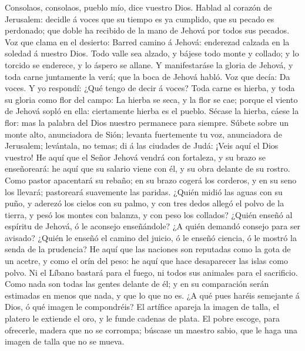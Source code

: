  Consolaos, consolaos, pueblo mío, dice vuestro Dios.
 Hablad al corazón de Jerusalem: decidle á voces que su
tiempo es ya cumplido, que su pecado es perdonado; que doble ha recibido
de la mano de Jehová por todos sus pecados.  Voz que clama
en el desierto: Barred camino á Jehová: enderezad calzada en la soledad
á nuestro Dios.  Todo valle sea alzado, y bájese todo
monte y collado; y lo torcido se enderece, y lo áspero se allane.
 Y manifestaráse la gloria de Jehová, y toda carne
juntamente la verá; que la boca de Jehová habló.  Voz que
decía: Da voces. Y yo respondí: ¿Qué tengo de decir á voces? Toda carne
es hierba, y toda su gloria como flor del campo:  La
hierba se seca, y la flor se cae; porque el viento de Jehová sopló en
ella: ciertamente hierba es el pueblo.  Sécase la hierba,
cáese la flor: mas la palabra del Dios nuestro permanece para siempre.
 Súbete sobre un monte alto, anunciadora de Sión; levanta
fuertemente tu voz, anunciadora de Jerusalem; levántala, no temas; di á
las ciudades de Judá: ¡Veis aquí el Dios vuestro!  He
aquí que el Señor Jehová vendrá con fortaleza, y su brazo se
enseñoreará: he aquí que su salario viene con él, y su obra delante de
su rostro.  Como pastor apacentará su rebaño; en su brazo
cogerá los corderos, y en su seno los llevará; pastoreará suavemente las
paridas.  ¿Quién midió las aguas con su puño, y aderezó
los cielos con su palmo, y con tres dedos allegó el polvo de la tierra,
y pesó los montes con balanza, y con peso los collados? 
¿Quién enseñó al espíritu de Jehová, ó le aconsejo enseñándole?
 ¿A quién demandó consejo para ser avisado? ¿Quién le
enseñó el camino del juicio, ó le enseñó ciencia, ó le mostró la senda
de la prudencia?  He aquí que las naciones son reputadas
como la gota de un acetre, y como el orín del peso: he aquí que hace
desaparecer las islas como polvo.  Ni el Líbano bastará
para el fuego, ni todos sus animales para el sacrificio. 
Como nada son todas las gentes delante de él; y en su comparación serán
estimadas en menos que nada, y que lo que no es.  ¿A qué
pues haréis semejante á Dios, ó qué imagen le compondréis?
 El artífice apareja la imagen de talla, el platero le
extiende el oro, y le funde cadenas de plata.  El pobre
escoge, para ofrecerle, madera que no se corrompa; búscase un maestro
sabio, que le haga una imagen de talla que no se mueva. 
